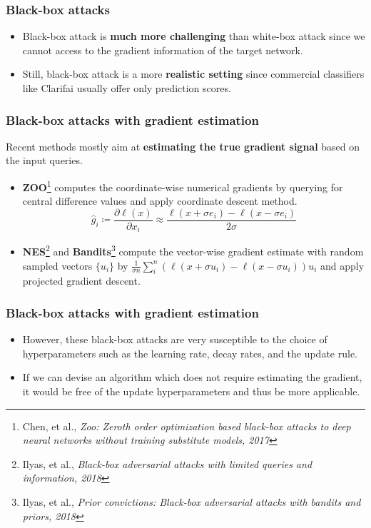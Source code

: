 \documentclass[10pt,mathserif]{beamer}
\begin{document}
\begin{frame}
    \frametitle{Black-box attacks}
    \begin{itemize}\itemsep=12pt
        \item Black-box attack is \textbf{much more challenging} than white-box attack since we cannot access to the gradient information of the target network.\pause
        \item Still, black-box attack is a more \textbf{realistic setting} since commercial classifiers like Clarifai usually offer only prediction scores.
    \end{itemize}
    
\end{frame}

\begin{frame}
\frametitle{Black-box attacks with gradient estimation}
Recent methods mostly aim at \textbf{estimating the true gradient signal} based on the input queries.\pause
\vspace{1em}
\begin{itemize}\itemsep=12pt
    \item \textbf{ZOO}\footnote{\scriptsize Chen, et al., \textit{Zoo: Zeroth order optimization based black-box attacks to deep neural networks without training substitute models, 2017}} computes the coordinate-wise numerical gradients by querying for central difference values and apply coordinate descent method.
    \[\hat g_i \coloneqq \frac{\partial \ell(x)}{\partial x_i} \approx \frac{\ell (x+\sigma e_i) - \ell (x-\sigma e_i)}{2\sigma}\] \vspace{-1.5em} \pause
    \item \textbf{NES}\footnote{\scriptsize Ilyas, et al., \textit{Black-box adversarial attacks with limited queries and information, 2018}} and \textbf{Bandits}\footnote{\scriptsize Ilyas, et al., \textit{Prior convictions: Black-box adversarial attacks with bandits and priors, 2018}} compute the vector-wise gradient estimate with random sampled vectors $\{u_i\}$ by $\frac{1}{\sigma n} \sum_{i}^{n}(\ell(x+\sigma u_i)-\ell(x-\sigma u_i))u_i$ and apply projected gradient descent.
\end{itemize}
\end{frame}

\begin{frame}
\frametitle{Black-box attacks with gradient estimation}
\begin{itemize}\itemsep=12pt
    \item However, these black-box attacks are very susceptible to the choice of hyperparameters such as the learning rate, decay rates, and the update rule.\pause
    \item If we can devise an algorithm which does not require estimating the gradient, it would be free of the update hyperparameters and thus be more applicable.
\end{itemize}
\end{frame}
\end{document}

